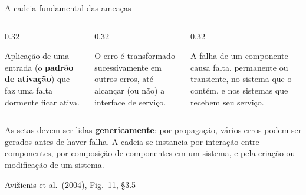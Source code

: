 \documentclass{beamer}
\newcommand{\sect}[1]{\par\smallskip\hfill{\tiny\color{black!55}Avi\v{z}ienis et al.\ (2004), #1}}
\begin{document}
\begin{frame}{A cadeia fundamental das amea\c{c}as}
    \centering
    \vspace{0.4em}
    \diagCadeia
    \vspace{0.6em}
    \footnotesize
    \begin{columns}[T]
        \begin{column}{0.32\textwidth}
            \begin{tcolorbox}[colback=depVermelho!5,colframe=depVermelho!65,boxrule=0.5pt,title={\tiny\bfseries Ativa\c{c}\~ao}]
                \scriptsize
                Aplica\c{c}\~ao de uma entrada (o \textbf{padr\~ao de ativa\c{c}\~ao}) que faz uma falta dormente ficar ativa.
            \end{tcolorbox}
        \end{column}
        \begin{column}{0.32\textwidth}
            \begin{tcolorbox}[colback=depLaranja!8,colframe=depLaranja!70,boxrule=0.5pt,title={\tiny\bfseries Propaga\c{c}\~ao}]
                \scriptsize
                O erro \'e transformado sucessivamente em outros erros, at\'e alcan\c{c}ar (ou n\~ao) a interface de servi\c{c}o.
            \end{tcolorbox}
        \end{column}
        \begin{column}{0.32\textwidth}
            \begin{tcolorbox}[colback=depAzul!5,colframe=depAzul!65,boxrule=0.5pt,title={\tiny\bfseries Causa\c{c}\~ao}]
                \scriptsize
                A falha de um componente causa falta, permanente ou transiente, no sistema que o cont\'em, e nos sistemas que recebem seu servi\c{c}o.
            \end{tcolorbox}
        \end{column}
    \end{columns}
    \smallskip
    \begin{ancora}
        \scriptsize
        As setas devem ser lidas \textbf{genericamente}: por propaga\c{c}\~ao, v\'arios erros podem ser gerados antes de haver falha. A cadeia se instancia por intera\c{c}\~ao entre componentes, por composi\c{c}\~ao de componentes em um sistema, e pela cria\c{c}\~ao ou modifica\c{c}\~ao de um sistema.
    \end{ancora}
    \sect{Fig.\ 11, \S3.5}
\end{frame}
\end{document}
